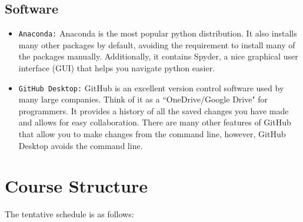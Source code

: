 \documentclass[11pt]{paper}
\begin{document}
\subsection{Software}
\begin{itemize}
\item \texttt{Anaconda:} Anaconda is the most popular python distribution. It also installs many other packages by default, avoiding the requirement to install many of the packages manually. Additionally, it contains Spyder, a nice graphical user interface (GUI) that helps you navigate python easier.	
\item \texttt{GitHub Desktop:} GitHub is an excellent version control software used by many large companies. Think of it as a ``OneDrive/Google Drive" for programmers. It provides a history of all the saved changes you have made and allows for easy collaboration. There are many other features of GitHub that allow you to make changes from the command line, however, GitHub Desktop avoids the command line.
\end{itemize}

\section{Course Structure}

The tentative schedule is as follows:   
\end{document}
